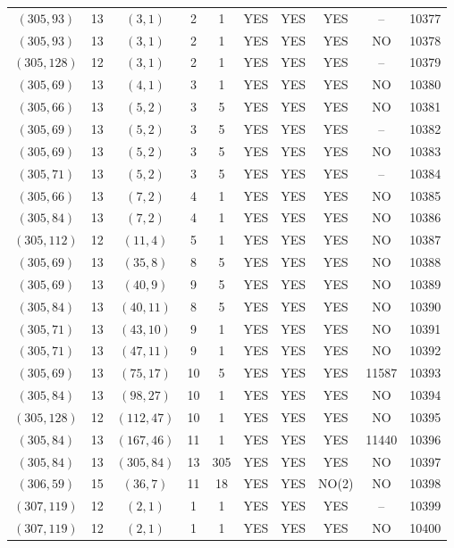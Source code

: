 \begin{longtable}{|c|c|c|c|c|c|c|c|c|c|}
$(305, 93)$ & 13 & $(3, 1)$ & 2 & 1 & YES & YES & YES & -- & 10377\\
$(305, 93)$ & 13 & $(3, 1)$ & 2 & 1 & YES & YES & YES & NO & 10378\\
$(305, 128)$ & 12 & $(3, 1)$ & 2 & 1 & YES & YES & YES & -- & 10379\\
$(305, 69)$ & 13 & $(4, 1)$ & 3 & 1 & YES & YES & YES & NO & 10380\\
$(305, 66)$ & 13 & $(5, 2)$ & 3 & 5 & YES & YES & YES & NO & 10381\\
$(305, 69)$ & 13 & $(5, 2)$ & 3 & 5 & YES & YES & YES & -- & 10382\\
$(305, 69)$ & 13 & $(5, 2)$ & 3 & 5 & YES & YES & YES & NO & 10383\\
$(305, 71)$ & 13 & $(5, 2)$ & 3 & 5 & YES & YES & YES & -- & 10384\\
$(305, 66)$ & 13 & $(7, 2)$ & 4 & 1 & YES & YES & YES & NO & 10385\\
$(305, 84)$ & 13 & $(7, 2)$ & 4 & 1 & YES & YES & YES & NO & 10386\\
$(305, 112)$ & 12 & $(11, 4)$ & 5 & 1 & YES & YES & YES & NO & 10387\\
$(305, 69)$ & 13 & $(35, 8)$ & 8 & 5 & YES & YES & YES & NO & 10388\\
$(305, 69)$ & 13 & $(40, 9)$ & 9 & 5 & YES & YES & YES & NO & 10389\\
$(305, 84)$ & 13 & $(40, 11)$ & 8 & 5 & YES & YES & YES & NO & 10390\\
$(305, 71)$ & 13 & $(43, 10)$ & 9 & 1 & YES & YES & YES & NO & 10391\\
$(305, 71)$ & 13 & $(47, 11)$ & 9 & 1 & YES & YES & YES & NO & 10392\\
$(305, 69)$ & 13 & $(75, 17)$ & 10 & 5 & YES & YES & YES & 11587 & 10393\\
$(305, 84)$ & 13 & $(98, 27)$ & 10 & 1 & YES & YES & YES & NO & 10394\\
$(305, 128)$ & 12 & $(112, 47)$ & 10 & 1 & YES & YES & YES & NO & 10395\\
$(305, 84)$ & 13 & $(167, 46)$ & 11 & 1 & YES & YES & YES & 11440 & 10396\\
$(305, 84)$ & 13 & $(305, 84)$ & 13 & 305 & YES & YES & YES & NO & 10397\\
$(306, 59)$ & 15 & $(36, 7)$ & 11 & 18 & YES & YES & NO(2) & NO & 10398\\
$(307, 119)$ & 12 & $(2, 1)$ & 1 & 1 & YES & YES & YES & -- & 10399\\
$(307, 119)$ & 12 & $(2, 1)$ & 1 & 1 & YES & YES & YES & NO & 10400\\

\end{longtable}
